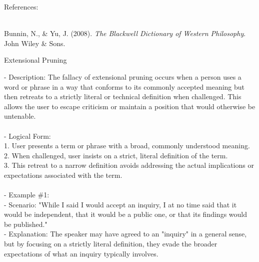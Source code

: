 \documentclass[a4paper,12pt,single,pdftex]{scrartcl}
\begin{document}
    References:

    
      
        
      \\

      
        
          Bunnin, N., \& Yu, J. (2008). {\it The Blackwell Dictionary of Western Philosophy}. John Wiley \& Sons.
        
      
    
  

Extensional Pruning
    
      - Description: The fallacy of extensional pruning occurs when a person uses a word or phrase in a way that conforms to its commonly accepted meaning but then retreats to a strictly literal or technical definition when challenged. This allows the user to escape criticism or maintain a position that would otherwise be untenable.
    \\

    
      
    \\

    
      - Logical Form:
    \\

    
        1. User presents a term or phrase with a broad, commonly understood meaning.
    \\

    
        2. When challenged, user insists on a strict, literal definition of the term.
    \\

    
        3. This retreat to a narrow definition avoids addressing the actual implications or expectations associated with the term.
    \\

    
      
    \\

    
      - Example \#1:
    \\

    
        - Scenario: "While I said I would accept an inquiry, I at no time said that it would be independent, that it would be a public one, or that its findings would be published."
    \\

    
        - Explanation: The speaker may have agreed to an "inquiry" in a general sense, but by focusing on a strictly literal definition, they evade the broader expectations of what an inquiry typically involves.
    \\
\end{document}
